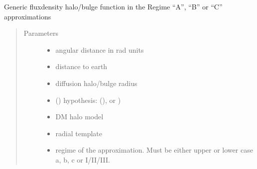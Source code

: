 \documentclass[letterpaper,10pt,english]{sphinxmanual}
\begin{document}

\begin{fulllineitems}
\label{\detokenize{diffsph.profiles:diffsph.profiles.hfactors.H_fluxdens}}
\sphinxAtStartPar
Generic flux\sphinxhyphen{}density halo/bulge function in the Regime “A”, “B” or “C” approximations
\begin{quote}\begin{description}
\item[{Parameters}] \leavevmode\begin{itemize}
\item {} 
\sphinxAtStartPar
{} \textendash{} angular distance in rad units

\item {} 
\sphinxAtStartPar
{} \textendash{} distance to earth

\item {} 
\sphinxAtStartPar
{} \textendash{} diffusion halo/bulge radius

\item {} 
\sphinxAtStartPar
{} () \textendash{} hypothesis:  (),  or )

\item {} 
\sphinxAtStartPar
{} \textendash{} DM halo model

\item {} 
\sphinxAtStartPar
{} \textendash{} radial template

\item {} 
\sphinxAtStartPar
{} \textendash{} regime of the approximation. Must be either upper or lower case a, b, c or I/II/III.


\end{itemize}
\end{description}
\end{quote}
\end{fulllineitems}
\end{document}
